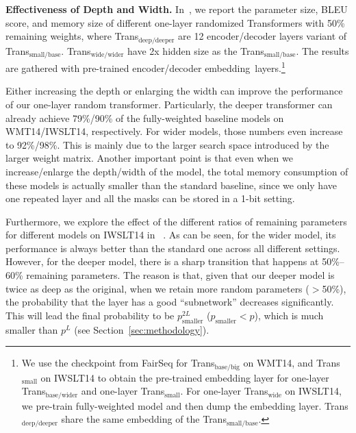 \noindent\textbf{Effectiveness of Depth and Width.}
In~, we report the parameter size, BLEU score, and memory size of different one-layer randomized Transformers with  50\% remaining weights, where Trans$_\text{deep/deeper}$ are 12 encoder/decoder layers variant of Trans$_\text{small/base}$. Trans$_\text{wide/wider}$ have 2x hidden size as the Trans$_\text{small/base}$. 
The results are gathered with pre-trained encoder/decoder embedding~layers.\footnote{We use the checkpoint from FairSeq for Trans$_\text{base/big}$ on WMT14, and Trans$_\text{small}$ on IWSLT14 to obtain the pre-trained embedding layer for one-layer Trans$_\text{base/wider}$ and one-layer Trans$_\text{small}$. 
For one-layer Trans$_\text{wide}$ on IWSLT14, we pre-train fully-weighted model and then dump the embedding layer. 
Trans$_\text{deep/deeper}$ share the same embedding of the Trans$_\text{small/base}$. } 

Either increasing the depth or enlarging the width can improve the performance of our one-layer random transformer. 
Particularly, the deeper transformer can already achieve 79\%/90\% of the fully-weighted baseline models on WMT14/IWSLT14, respectively. 
For wider models, those numbers even increase to 92\%/98\%. 
This is mainly due to the larger search space introduced by the larger weight matrix. 
Another important point is that even when we increase/enlarge the depth/width of the model, the total memory consumption of these models is actually smaller than the standard baseline, since we only have one repeated layer and all the masks can be stored in a 1-bit setting. 

Furthermore, we explore the effect of the different ratios of remaining parameters for different models on IWSLT14 in ~. 
As can be seen, for the wider model, its performance is always better than the standard one across all different settings. 
However, for the deeper model, there is a sharp transition that happens at 50\%--60\% remaining parameters. 
The reason is that, given that our deeper model is twice as deep as the original, when we retain more random parameters ($>$50\%), the probability that the layer has a good ``subnetwork'' decreases significantly. 
This will lead the final probability to be $p_\text{smaller}^{2L}$ ($p_\text{smaller}<p$), which is much smaller than $p^L$ (see Section~\ref{sec:methodology}). 

